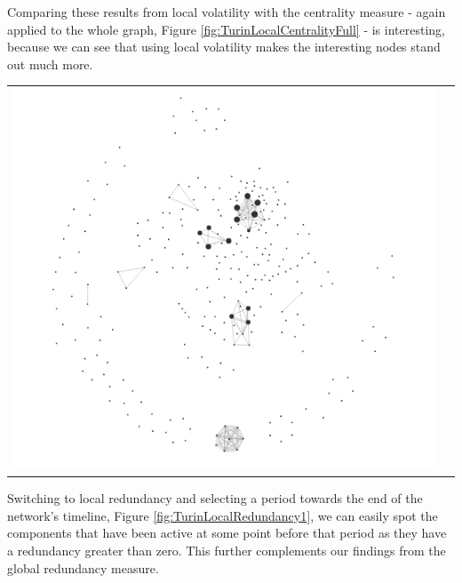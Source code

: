 \begin{center}
\end{center}
Comparing these results from local volatility with the centrality measure - again applied to the whole graph, Figure \ref{fig:TurinLocalCentralityFull} - is interesting, because we can see that using local volatility makes the interesting nodes stand out much more. 
\begin{center}
\begin{tabular}{cc}
\includegraphics[trim={0 0 0 0}, width=140mm]{./Figures/TurinLocalRedundancy1.png}
\end{tabular}
\label{fig:TurinLocalRedundancy1}
\end{center}
Switching to local redundancy and selecting a period towards the end of the network's timeline, Figure \ref{fig:TurinLocalRedundancy1}, we can easily spot the components that have been active at some point before that period as they have a redundancy greater than zero. This further complements our findings from the global redundancy measure.

